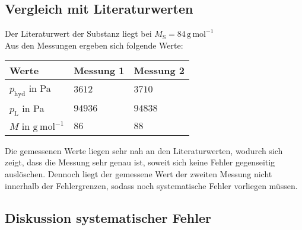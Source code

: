 \documentclass[12pt,a4paper,titlepage,headinclude,bibtotoc]{scrartcl}
\begin{document}
\subsection{Vergleich mit Literaturwerten}

Der Literaturwert der Substanz liegt bei 
$M_\mathrm{S} = 84\, \mathrm{g\,mol^{-1}}$
\\


Aus den Messungen ergeben sich folgende Werte:\\


\begin{table} [h]
\centering
\begin{tabular}{|p{4 cm}||p{4 cm}|p{4 cm}|}
        \hline
		Werte & Messung 1 & Messung 2\\
         \hline 
        $ p_\mathrm{hyd}$ in Pa & $3612$  & $3710$ \\
        \hline
        $ p_\mathrm{L}   $ in Pa & $94936$  & $94838$ \\
        \hline
        $ M $ in $\mathrm{g{~}mol^{-1}}$ & $86$ & $88$ \\
        \hline     
\end{tabular}
\end{table}

Die gemessenen Werte liegen sehr nah an den Literaturwerten, wodurch sich zeigt, dass die Messung sehr genau ist, soweit sich keine Fehler gegenseitig auslöschen. Dennoch liegt der gemessene Wert der zweiten Messung nicht innerhalb der Fehlergrenzen, sodass noch systematische Fehler vorliegen müssen.

\subsection{Diskussion systematischer Fehler}
\end{document}
